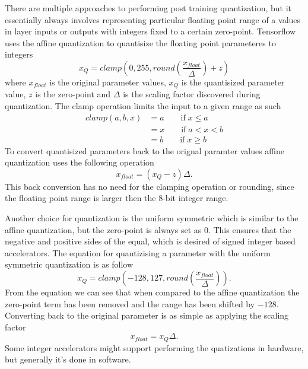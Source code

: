 \documentclass[12pt,a4paper,english
]{tunithesis}
\begin{document}
There are multiple approaches to performing post training quantization, but it essentially always involves representing particular floating point range of a values in layer inputs or outputs with integers fixed to a certain zero-point. Tensorflow uses the affine quantization to quantisize the floating point parameteres to integers
\begin{equation}
  x_{Q} = clamp(0, 255, round(\frac{x_{float}}{\Delta}) + z)
\end{equation}
where $x_{float}$ is the original parameter values, $x_{Q}$ is the quantisized parameter value, $z$ is the zero-point and $\Delta$ is the scaling factor discovered during quantization.
The clamp operation limits the input to a given range as such
\begin{align}
  clamp(a, b, x) & = a \qquad \text{if} \; x \leq a  \\
                 & = x \qquad \text{if} \; a < x < b  \\
                 & = b \qquad \text{if} \; x \geq b
\end{align}
To convert quantisized parameters back to the orignal paramter values affine quantization uses the following operation
\begin{equation}
  x_{float} = (x_{Q}-z)\Delta.
\end{equation}
This back conversion has no need for the clamping operation or rounding, since the floating point range is larger then the 8-bit integer range.

Another choice for quantization is the uniform symmetric which is similar to the affine quantization, but the zero-point is always set as 0. This ensures that the negative and positive sides of the equal, which is desired of signed integer based accelerators. The equation for quantizising a parameter with the uniform symmetric quantization is as follow
\begin{equation}
  x_{Q} = clamp(-128, 127, round(\frac{x_{float}}{\Delta})).
\end{equation}
From the equation we can see that when compared to the affine quantization the zero-point term has been removed and the range has been shifted by $-128$. Converting back to the original parameter is as simple as applying the scaling factor
\begin{equation}
  x_{float} = x_{Q}\Delta.
\end{equation}
Some integer accelerators might support performing the quatizations in hardware, but generally it's done in software.
\end{document}
